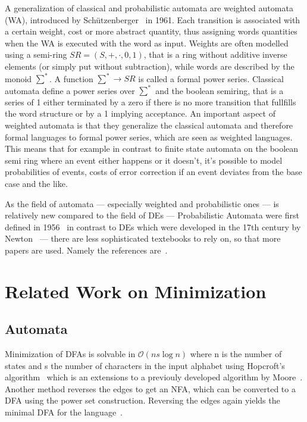 \documentclass[11pt, rgb]{scrartcl}
\begin{document}
A generalization of classical and probabilistic automata are weighted automata (WA), introduced by Schützenberger~\autocite{schutz} in 1961. 
Each transition is associated with a certain weight, cost or more abstract quantity, thus assigning words quantities when the WA is executed with the word as input. 
Weights are often modelled using a semi-ring $SR = (S, +, \cdot, 0, 1)$, that is a ring without additive inverse elements (or simply put without subtraction), while words are described by the monoid $\sum^*$.
A function $\sum^* \rightarrow SR$ is called a formal power series.
Classical automata define a power series over $\sum^*$ and the boolean semiring, that is a series of 1 either terminated by a zero if there is no more transition that fullfills the word structure or by a 1 implying acceptance.
An important aspect of weighted automata is that they generalize the classical automata and therefore formal languages to formal power series, which are seen as weighted languages. This means that for example in contrast to finite state automata on the boolean semi ring where an event either happens or it doesn't, it's possible to model probabilities of events, costs of error correction if an event deviates from the base case and the like.

As the field of automata --- especially weighted and probabilistic ones --- is relatively new compared to the field of DEs --- Probabilistic Automata were first defined in 1956~\autocite{automatastudies} in contrast to DEs which were developed in the 17th century by Newton~\autocite{newton} --- there are less sophisticated textebooks to rely on, so that more papers are used. 
Namely the references are~\cite{sokolova, automatastudies, ppat, ata, hwa, paz, wolf, stoelinga, survey, patypes, pg, rpga, stochsysI, stochsysII, rabin, schoning}.  

\section{Related Work on Minimization}
\subsection{Automata}
Minimization of DFAs is solvable in $\mathcal{O}(ns \log n)$ where n is the number of states and s the number of characters in the input alphabet using Hopcroft's algorithm~\autocite{hopcroft1971n} which is an extensions to a previouly developed algorithm by Moore~\autocite{automatastudies}. 
Another method reverses the edges to get an NFA, which can be converted to a DFA using the power set construction. 
Reversing the edges again yields the minimal DFA for the language~\autocite{brzozowski}. 
\end{document}
